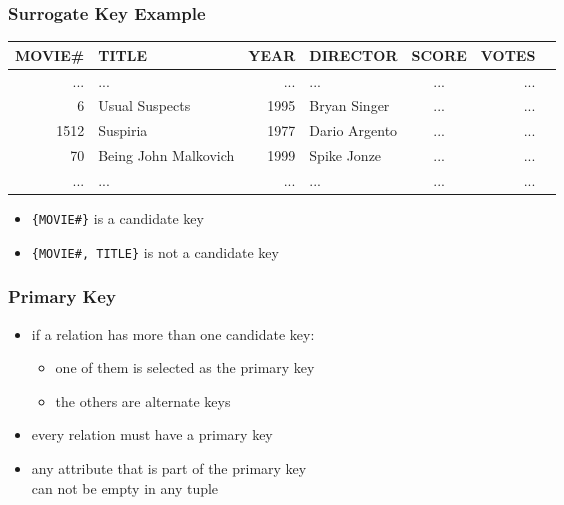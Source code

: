 \documentclass[dvipsnames]{beamer}
\theoremstyle{plain}
\begin{document}
\begin{frame}
  \frametitle{Surrogate Key Example}

  \begin{example}
    \begin{tiny}
    \begin{table}
      \begin{tabular}{|r|l|r|l|c|r|r|}\hline
MOVIE\# & TITLE                & YEAR & DIRECTOR      & SCORE & VOTES\\\hline\hline
    ... & ...                  &  ... & ...           & ...   &   ...\\\hline
      6 & Usual Suspects       & 1995 & Bryan Singer  & ...   &   ...\\\hline
   1512 & Suspiria             & 1977 & Dario Argento & ...   &   ...\\\hline
     70 & Being John Malkovich & 1999 & Spike Jonze   & ...   &   ...\\\hline
    ... & ...                  &  ... & ...           & ...   &   ...\\\hline
      \end{tabular}
    \end{table}
    \end{tiny}

    \pause
    \begin{itemize}
      \item \texttt{\{MOVIE\#\}} is a candidate key
      \item \texttt{\{MOVIE\#, TITLE\}} is not a candidate key
    \end{itemize}
  \end{example}
\end{frame}

\begin{frame}
  \frametitle{Primary Key}

  \begin{itemize}
    \item if a relation has more than one candidate key:
    \begin{itemize}
      \item one of them is selected as the \alert{primary key}
      \item the others are \alert{alternate keys}
    \end{itemize}

    \pause
    \item every relation must have a primary key

    \pause
    \item any attribute that is part of the primary key\\
      can not be empty in any tuple
  \end{itemize}
\end{frame}
\end{document}
